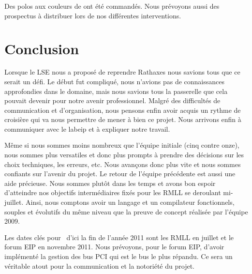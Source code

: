 \documentclass[francais]{rtxreport}
\begin{document}
Des polos aux couleurs de \rtx ont été commandés. Nous prévoyons aussi des
prospectus à distribuer lors de nos différentes interventions.


\chapter{Conclusion}


Lorsque le LSE nous a proposé de reprendre Rathaxes nous savions tous que ce
serait un défi. Le début fut compliqué, nous n’avions pas de connaissances
approfondies dans le domaine, mais nous savions tous la passerelle que cela
pouvait devenir pour notre avenir professionnel. Malgré des difficultés de
communication et d’organisation, nous pensons enfin avoir acquis un rythme de
croisière qui va nous permettre de mener à bien ce projet. Nous arrivons enfin
à communiquer avec le labeip et à expliquer notre travail.

Même si nous sommes moins nombreux que l’équipe initiale (cinq contre onze),
nous sommes plus versatiles et donc plus prompts à prendre des décisions sur les
choix techniques, les erreurs, etc. Nous avançons donc plus vite et nous sommes
confiants sur l’avenir du projet. Le retour de l'équipe précédente est aussi
une aide précieuse. Nous sommes plutôt dans les temps et avons bon espoir
d'atteindre nos objectifs intermédiaires fixés pour les RMLL se deroulant
mi-juillet. Ainsi, nous comptons avoir un langage et un compilateur
fonctionnels, souples et évolutifs du même niveau que la preuve de concept
réalisée par l'équipe 2009.

Les dates clés pour \rtx\ d'ici la fin de l'année 2011 sont les RMLL en juillet
et le forum EIP en novembre 2011. Nous prévoyons, pour le forum EIP, d'avoir
implémenté la gestion des bus PCI qui est le bus le plus répandu. Ce sera un
véritable atout pour la communication et la notoriété du projet.
\end{document}
